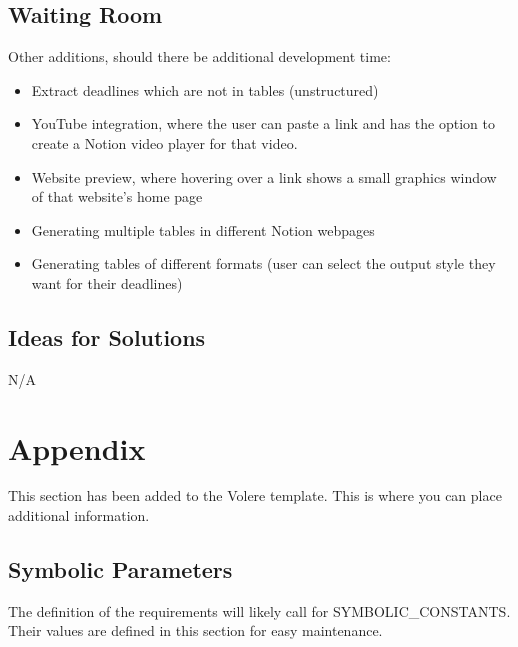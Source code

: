 \documentclass[12pt, titlepage]{article}
\begin{document}
\subsection{Waiting Room}
Other additions, should there be additional development time:
\begin{itemize}
  \item Extract deadlines which are not in tables (unstructured)
  \item YouTube integration, where the user can paste a link and has the option to create a Notion video player for that video.
  \item Website preview, where hovering over a link shows a small graphics window of that website’s home page
  \item Generating multiple tables in different Notion webpages
  \item Generating tables of different formats (user can select the output style they want for their deadlines)
\end{itemize}

\subsection{Ideas for Solutions}
N/A





\newpage

\section{Appendix}

This section has been added to the Volere template.  This is where you can place
additional information.

\subsection{Symbolic Parameters}

The definition of the requirements will likely call for SYMBOLIC\_CONSTANTS.
Their values are defined in this section for easy maintenance.
\end{document}
